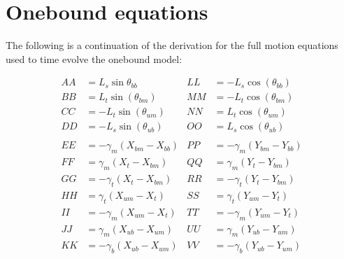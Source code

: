 \documentclass[
11pt, %
english, %
singlespacing, %
headsepline, %
chapterinoneline, %
]{MastersDoctoralThesis} %
\begin{document}

\allowdisplaybreaks

\chapter{Onebound equations} %
\label{sec:AppendixOneboundEquations}

The following is a continuation of the derivation for the full motion equations used to time evolve the onebound model:

\begin{align*}
AA &= L_s\sin\theta_{bb}      &   LL &= -L_s\cos(\theta_{bb})\\
BB &= L_t\sin(\theta_{bm})    &	 MM &= -L_t\cos(\theta_{bm})\\
CC &= -L_t\sin(\theta_{um})   &	 NN &= L_t\cos(\theta_{um})\\
DD &= -L_s\sin(\theta_{ub})   &	 OO &= L_s\cos(\theta_{ub})\\
\\
EE &= -\gamma_m (X_{bm} - X_{bb})       &  PP &= -\gamma_m (Y_{bm} - Y_{bb})\\
FF &= \gamma_m (X_{t } - X_{bm})        &	 QQ &= \gamma_m (Y_{t } - Y_{bm})\\ 
GG &= -\gamma_t (X_{t } - X_{bm})       &	 RR &= -\gamma_t (Y_{t } - Y_{bm})\\
HH &= \gamma_t (X_{um} - X_{t })        &	 SS &= \gamma_t (Y_{um} - Y_{t })\\ 
II &= -\gamma_m (X_{um} - X_{t })       &	 TT &= -\gamma_m (Y_{um} - Y_{t })\\
JJ &= \gamma_m (X_{ub} - X_{um})        &	 UU &= \gamma_m (Y_{ub} - Y_{um})\\ 
KK &= -\gamma_b (X_{ub} - X_{um})       &	 VV &= -\gamma_b (Y_{ub} - Y_{um})\\
\end{align*}%
%
\end{document}
